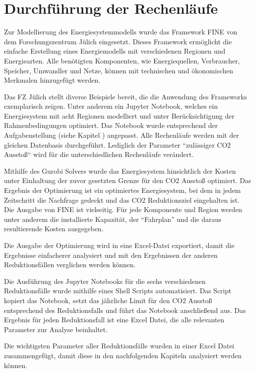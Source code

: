 \section{Durchführung der Rechenläufe}
Zur Modellierung des Energiesystemmodells wurde das Framework FINE von dem Forschungszentrum Jülich eingesetzt.
Dieses Framework ermöglicht die einfache Erstellung eines Energiemodells mit verschiedenen Regionen und Energiearten. Alle benötigten Komponenten, wie Energiequellen, Verbraucher, Speicher, Umwandler und Netze, können mit technischen und ökonomischen Merkmalen hinzugefügt werden. 

Das FZ Jülich stellt diverse Beispiele bereit, die die Anwendung des Frameworks exemplarisch zeigen. Unter anderem ein Jupyter Notebook, welches ein Energiesystem mit acht Regionen modelliert und unter Berücksichtigung der Rahmenbedingungen optimiert.  Das Notebook wurde entsprechend der Aufgabenstellung (siehe Kapitel ) angepasst. Alle Rechenläufe werden mit der gleichen Datenbasis durchgeführt. Lediglich der Parameter ``zulässiger CO2 Ausstoß`` wird für die unterschiedlichen Rechenläufe verändert. 

Mithilfe des Gurobi Solvers wurde das Energiesystem hinsichtlich der Kosten unter Einhaltung der zuvor gesetzten Grenze für den CO2 Ausstoß optimiert. Das Ergebnis der Optimierung ist ein optimiertes Energiesystem, bei dem in jedem Zeitschritt die Nachfrage gedeckt und das CO2 Reduktionsziel eingehalten ist. Die Ausgabe von FINE ist vielseitig. Für jede Komponente und Region werden unter anderem die installierte Kapazität, der ``Fahrplan'' und die daraus resultierende Kosten ausgegeben.

Die Ausgabe der Optimierung wird in eine Excel-Datei exportiert, damit die Ergebnisse einfacherer analysiert und mit den Ergebnissen der anderen Reduktionsfällen verglichen werden können. 

Die Ausführung des Jupyter Notebooks für die sechs verschiedenen Reduktionsfälle wurde mithilfe eines Shell Scripts automatisiert. Das Script kopiert das Notebook, setzt das jährliche Limit für den CO2 Ausstoß entsprechend des Reduktionsfalls und führt das Notebook anschließend aus. Das Ergebnis für jeden Reduktionsfall ist eine Excel Datei, die alle relevanten Parameter zur Analyse beinhaltet.

Die wichtigsten Parameter aller Reduktionsfälle wurden in einer Excel Datei zusammengefügt, damit diese in den nachfolgenden Kapiteln analysiert werden können.

